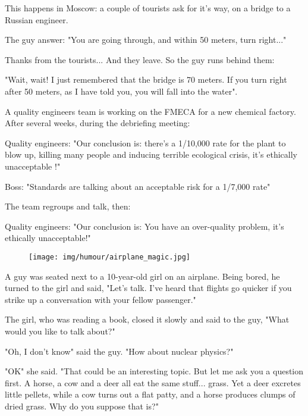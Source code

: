 This happens in Moscow: a couple of tourists ask for it's way, on a bridge to a Russian engineer.

The guy answer: "You are going through, and within 50 meters, turn right..."

Thanks from the tourists... And they leave. So the guy runs behind them:

"Wait, wait! I just remembered that the bridge is 70 meters. If you turn right after 50 meters, as I have told you, you will fall into the water".
\begin{center}\underline{\hspace{5 cm}}\end{center}

A quality engineers team is working on the FMECA for a new chemical factory. After several weeks, during the debriefing meeting: 

Quality engineers: "Our conclusion is: there's a 1/10,000 rate for the plant to blow up, killing many people and inducing terrible ecological crisis, it's ethically unacceptable !" 

Boss: "Standards are talking about an acceptable risk for a 1/7,000 rate" 

The team regroups and talk, then: 

Quality engineers: "Our conclusion is: You have an over-quality problem, it's ethically unacceptable!"

\begin{center}\underline{\hspace{5 cm}}\end{center}
	\begin{figure}[H]
		\centering
		\texttt{[image: img/humour/airplane\_magic.jpg]}
	\end{figure}
\begin{center}\underline{\hspace{5 cm}}\end{center}

A guy was seated next to a 10-year-old girl on an airplane. Being bored, he turned to the girl and said, "Let's talk. I've heard that flights go quicker if you strike up a conversation with your fellow passenger."

The girl, who was reading a book, closed it slowly and said to the guy, "What would you like to talk about?"

"Oh, I don't know" said the guy. "How about nuclear physics?"

"OK" she said. "That could be an interesting topic. But let me ask you a question first. A horse, a cow and a deer all eat the same stuff... grass. Yet a deer excretes little pellets, while a cow turns out a flat patty, and a horse produces clumps of dried grass. Why do you suppose that is?"

